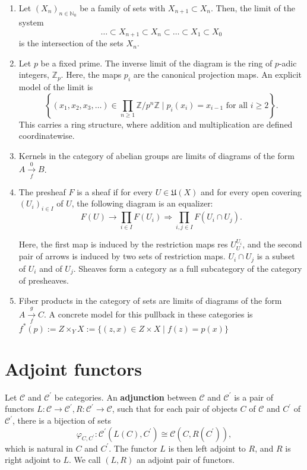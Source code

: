 \begin{example}[Limits]
    \begin{enumerate}
        \item Let $\left(X_n\right)_{n \in \mathbb{N}_0}$ be a family of sets with $X_{n+1} \subset X_n$. Then, the limit of the system
        $$
        \ldots \subset X_{n+1} \subset X_n \subset \ldots \subset X_1 \subset X_0
        $$
        is the intersection of the sets $X_n$.
        \item Let $p$ be a fixed prime. The inverse limit of the diagram
        is the ring of $p$-adic integers, $\mathbb{Z}_p$. Here, the maps $p_i$ are the canonical projection maps. An explicit model of the limit is
        $$
        \left\{\left(x_1, x_2, x_3, \ldots\right) \in \prod_{n \geq 1} \mathbb{Z} / p^n \mathbb{Z} \mid p_i\left(x_i\right)=x_{i-1} \text { for all } i \geq 2\right\} .
        $$
        This carries a ring structure, where addition and multiplication are defined coordinatewise.
        \item Kernels in the category of abelian groups are limits of diagrams of the form $A \underset{f}{\stackrel{0}{\longrightarrow}} B$.
        \item The presheaf $F$ is a sheaf if for every $U \in \mathfrak{U}(X)$ and for every open covering $\left(U_i\right)_{i \in I}$ of $U$, the following diagram is an equalizer:
        $$
        F(U) \longrightarrow \prod_{i \in I} F\left(U_i\right) \Longrightarrow \prod_{i, j \in I} F\left(U_i \cap U_j\right) .
        $$
        
        Here, the first map is induced by the restriction maps res $U_U^{U_i}$, and the second pair of arrows is induced by two sets of restriction maps. $U_i \cap U_j$ is a subset of $U_i$ and of $U_j$.
        Sheaves form a category as a full subcategory of the category of presheaves.
        \item Fiber products in the category of sets are limits of diagrams of the form $A \underset{f}{\stackrel{g}{\longrightarrow}} C$. A concrete model for this pullback in these categories is $f^*(p):=Z \times_Y X:=\{(z, x) \in Z \times X \mid f(z)=p(x)\}$
    \end{enumerate}
\end{example}


\section{Adjoint functors}

Let $\mathcal{C}$ and $\mathcal{C}^{\prime}$ be categories. An \textbf{adjunction} between $\mathcal{C}$ and $\mathcal{C}^{\prime}$ is a pair of functors $L: \mathcal{C} \rightarrow \mathcal{C}^{\prime}, R: \mathcal{C}^{\prime} \rightarrow \mathcal{C}$, such that for each pair of objects $C$ of $\mathcal{C}$ and $C^{\prime}$ of $\mathcal{C}^{\prime}$, there is a bijection of sets
$$
\varphi_{C, C^{\prime}}: \mathcal{C}^{\prime}\left(L(C), C^{\prime}\right) \cong \mathcal{C}\left(C, R\left(C^{\prime}\right)\right),
$$
which is natural in $C$ and $C^{\prime}$.
The functor $L$ is then left adjoint to $R$, and $R$ is right adjoint to $L$. We call $(L, R)$ an adjoint pair of functors.

